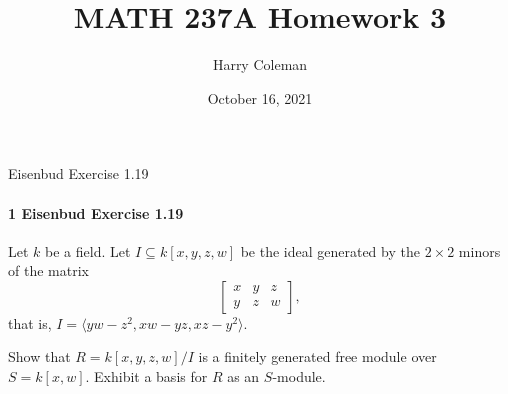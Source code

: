 \documentclass[12pt]{article}
\renewcommand{\maketitle}{\thispagestyle{title}}
\newlength{\myparskip}
\newenvironment{fullbox}{\begin{lrbox}{\savefullbox}\begin{minipage}{\dimexpr\textwidth-2\fboxsep\relax}\setlength{\parskip}{\myparskip}}{\end{minipage}\end{lrbox}\framebox[\textwidth]{\usebox{\savefullbox}}}
\newenvironment{pbox}[1][]{\begin{fullbox}\ifx#1\empty\else\paragraph{#1}\fi}{\end{fullbox}}
\newcommand{\<}{\langle}
\renewcommand{\>}{\rangle}
\begin{document}
\title{MATH 237A Homework 3}
\author{Harry Coleman\makebox[0pt][r]{\raisebox{-0.25in}[0pt][0pt]{(worked with Joseph Sullivan)}}}
\date{October 16, 2021}
\maketitle


\begin{pbox}[1 Eisenbud Exercise 1.19]
    Let $k$ be a field. Let $I \subseteq k[x, y, z, w]$ be the ideal generated by the $2 \times 2$ minors of the matrix
    \[
        \begin{bmatrix}
            x & y & z \\
            y & z & w
        \end{bmatrix},
    \]
    that is, $I = \<yw - z^2, xw - yz, xz - y^2\>$.

    Show that $R = k[x, y, z, w]/I$ is a finitely generated free module over $S = k[x, w]$. Exhibit a basis for $R$ as an $S$-module.
\end{pbox}
\end{document}
